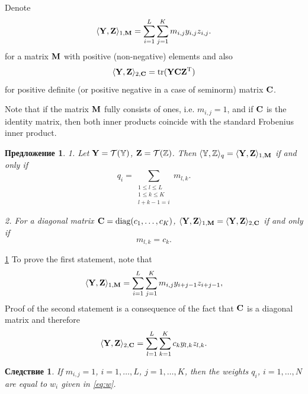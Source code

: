 \documentclass[12pt,a4paper,fleqn,leqno]{article}
\DeclareMathOperator{\tr}{tr}
\newtheorem{corollary}{Следствие}
\newtheorem{proposition}{Предложение}
\begin{document}
Denote
\begin{equation}
\label{eq:norm1M}
    \langle\mathbf{Y},\mathbf{Z}\rangle_{1,\mathbf{M}} = \sum_{i = 1}^L \sum_{j=1}^K m_{i,j} y_{i,j} z_{i,j}.
\end{equation}
for a matrix $\mathbf{M}$ with positive (non-negative) elements and also
\begin{equation}
\label{eq:norm2S}
    \langle\bfY,\bfZ\rangle_{2,\bfC} = \tr(\bfY \bfC \bfZ^\rmT)
\end{equation}
for positive definite (or positive negative in a case of seminorm) matrix $\mathbf{C}$.

Note that if the matrix $\mathbf{M}$ fully consists of ones, i.e. $m_{i,j}=1$,
and if $\mathbf{C}$ is the identity matrix, then both inner products coincide with the standard Frobenius inner product.

\begin{proposition}
\label{prop:equiv_tasks}
1. Let $\mathbf{Y} = \mathcal{T}(\mathbb{Y})$,  $\mathbf{Z} = \mathcal{T}(\mathbb{Z})$. Then $\langle\mathbb{Y},\mathbb{Z}\rangle_q= \langle \mathbf{Y},\mathbf{Z} \rangle_{1,\mathbf{M}}$ if and only if
\begin{equation}\label{qi_mi}
q_i = \sum_{\substack{1 \le l \le L \\ 1 \le k \le K \\ l+k-1=i}} m_{l,k}.
\end{equation}

2. For a diagonal matrix $\mathbf{C}=\mathop{\mathrm{diag}}(c_1,\ldots,c_K)$, $\langle\mathbf{Y},\mathbf{Z}\rangle_{1,\mathbf{M}}= \langle\mathbf{Y},\mathbf{Z}\rangle_{2,\mathbf{C}}$ if and only if
\begin{equation}\label{sk_mlk}
m_{l,k}=c_k.
\end{equation}
\end{proposition}
\begin{proof5}{\ref{prop:equiv_tasks}}
To prove the first statement, note that
\begin{equation*}
\langle \mathbf{Y}, \mathbf{Z} \rangle_{1,\mathbf{M}} = \sum_{i = 1}^L \sum_{j = 1}^K m_{i,j} y_{i + j - 1} z_{i + j - 1},
\end{equation*}
Proof of the second statement is a consequence of the fact that $\mathbf{C}$ is a diagonal matrix and therefore
\begin{equation*}
\langle \mathbf{Y}, \mathbf{Z} \rangle_{2,\mathbf{C}} = \sum_{l=1}^L \sum_{k=1}^K c_k y_{l,k} z_{l, k}.
\end{equation*}
\end{proof5}

\begin{corollary}
\label{cor:base_weights}
If $m_{i,j}=1$, $i =1, \ldots, L$, $j = 1, \ldots, K$, then the weights $q_i$, $i = 1, \ldots, N$ are equal to $w_i$ given in \eqref{eq:w}.
\end{corollary}
\end{document}
